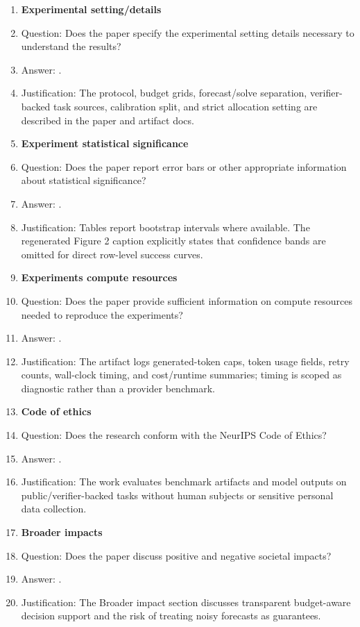 \begin{enumerate}
\item {\bf Experimental setting/details}
    \item[] Question: Does the paper specify the experimental setting details necessary to understand the results?
    \item[] Answer: \answerYes{}.
    \item[] Justification: The protocol, budget grids, forecast/solve separation, verifier-backed task sources, calibration split, and strict allocation setting are described in the paper and artifact docs.

\item {\bf Experiment statistical significance}
    \item[] Question: Does the paper report error bars or other appropriate information about statistical significance?
    \item[] Answer: \answerYes{}.
    \item[] Justification: Tables report bootstrap intervals where available. The regenerated Figure 2 caption explicitly states that confidence bands are omitted for direct row-level success curves.

\item {\bf Experiments compute resources}
    \item[] Question: Does the paper provide sufficient information on compute resources needed to reproduce the experiments?
    \item[] Answer: \answerYes{}.
    \item[] Justification: The artifact logs generated-token caps, token usage fields, retry counts, wall-clock timing, and cost/runtime summaries; timing is scoped as diagnostic rather than a provider benchmark.

\item {\bf Code of ethics}
    \item[] Question: Does the research conform with the NeurIPS Code of Ethics?
    \item[] Answer: \answerYes{}.
    \item[] Justification: The work evaluates benchmark artifacts and model outputs on public/verifier-backed tasks without human subjects or sensitive personal data collection.

\item {\bf Broader impacts}
    \item[] Question: Does the paper discuss positive and negative societal impacts?
    \item[] Answer: \answerYes{}.
    \item[] Justification: The Broader impact section discusses transparent budget-aware decision support and the risk of treating noisy forecasts as guarantees.


\end{enumerate}
